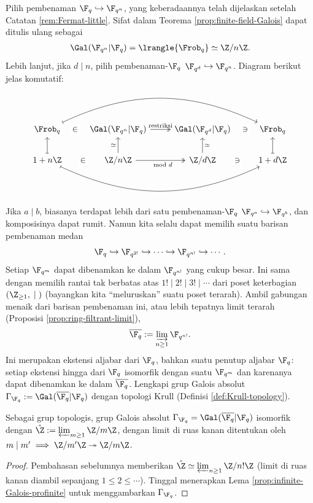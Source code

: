 Pilih pembenaman $\F_q\hookrightarrow\F_{q^n}$, yang keberadaannya telah dijelaskan setelah Catatan \ref{rem:Fermat-little}. Sifat dalam Teorema \ref{prop:finite-field-Galois} dapat ditulis ulang sebagai
\begin{gather*}
	\Gal(\F_{q^n}|\F_q) = \lrangle{\Frob_q} \simeq \Z/n\Z.
\end{gather*}
Lebih lanjut, jika $d\mid n$, pilih pembenaman-$\F_q$ $\F_{q^d}\hookrightarrow\F_{q^n}$. Diagram berikut jelas komutatif:
\begin{equation}\label{eqn:finite-Galois-transition}\begin{tikzcd}
	\Frob_q \arrow[phantom, r, "\in" description] \arrow[mapsto, rrr, bend left=25] & \Gal(\F_{q^n}|\F_q) \arrow[twoheadrightarrow, r, "\text{restriksi}"] & \Gal(\F_{q^d}| \F_q) & \Frob_q \arrow[phantom, l, "\ni" description] \\
	1 + n\Z \arrow[mapsto, u] \arrow[phantom, r, "\in" description] \arrow[mapsto, rrr, bend right=25] & \Z/n\Z \arrow[u, "\simeq"] \arrow[twoheadrightarrow, r, "\mod d"'] & \Z/d\Z \arrow[u, "\simeq"'] & 1 + d\Z \arrow[mapsto, u] \arrow[phantom, l, "\ni" description]
\end{tikzcd}\end{equation}
Jika $a\mid b$, biasanya terdapat lebih dari satu pembenaman-$\F_q$ $\F_{q^a}\hookrightarrow\F_{q^b}$, dan komposisinya dapat rumit. Namun kita selalu dapat memilih suatu barisan pembenaman medan
\[ \F_q \hookrightarrow \F_{q^{2!}} \hookrightarrow \cdots \hookrightarrow \F_{q^{n!}} \hookrightarrow \cdots . \]
Setiap $\F_{q^m}$ dapat dibenamkan ke dalam $\F_{q^{n!}}$ yang cukup besar. Ini sama dengan memilih rantai tak berbatas atas $1!\mid2!\mid3!\mid\cdots$ dari poset keterbagian $\left(\Z_{\geq1},\;\mid\;\right)$ (bayangkan kita ``meluruskan'' suatu poset terarah). Ambil gabungan menaik dari barisan pembenaman ini, atau lebih tepatnya limit terarah (Proposisi \ref{prop:ring-filtrant-limit}),
\[ \overline{\F_q} := \varinjlim_{n \geq 1} \F_{q^{n!}}. \]
Ini merupakan ekstensi aljabar dari $\F_q$, bahkan suatu penutup aljabar $\F_q$: setiap ekstensi hingga dari $\F_q$ isomorfik dengan suatu $\F_{q^m}$ dan karenanya dapat dibenamkan ke dalam $\overline{\F_q}$. Lengkapi grup Galois absolut $\Gamma_{\F_q}:=\Gal(\overline{\F_q}|\F_q)$ dengan topologi Krull (Definisi \ref{def:Krull-topology}).

\begin{proposition}
	Sebagai grup topologis, grup Galois absolut $\Gamma_{\F_q}=\Gal(\overline{\F_q}|\F_q)$ isomorfik dengan $\hat{\Z}:=\varprojlim_{m\geq1}\Z/m\Z$, dengan limit di ruas kanan ditentukan oleh $m\mid m'\implies\Z/m'\Z\twoheadrightarrow\Z/m\Z$.
\end{proposition}
\begin{proof}
	Pembahasan sebelumnya memberikan $\hat{\Z}\simeq\varprojlim_{n\geq1}\Z/n!\Z$ (limit di ruas kanan diambil sepanjang $1\leq2\leq\cdots$). Tinggal menerapkan Lema \ref{prop:infinite-Galois-profinite} untuk menggambarkan $\Gamma_{\F_q}$.
\end{proof}

